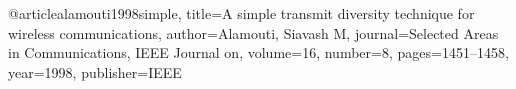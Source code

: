\begin{thebibliography}
@article{alamouti1998simple,
  title={A simple transmit diversity technique for wireless communications},
  author={Alamouti, Siavash M},
  journal={Selected Areas in Communications, IEEE Journal on},
  volume={16},
  number={8},
  pages={1451--1458},
  year={1998},
  publisher={IEEE}
}
\end{thebibliography}